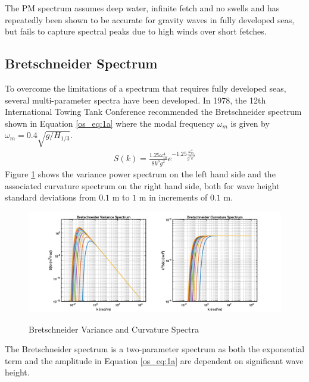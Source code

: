 The PM spectrum assumes deep water, infinite fetch and no swells and has repeatedly been shown to be accurate for gravity waves in fully developed seas, but fails to capture spectral peaks due to high winds over short fetches.

\subsection{Bretschneider Spectrum}
To overcome the limitations of a spectrum that requires fully developed seas, several multi-parameter spectra have been developed. In 1978, the 12th International Towing Tank Conference recommended the Bretschneider spectrum \cite{michel_sea_spectra} shown in Equation \ref{os_eq:1a} where the modal frequency $\omega_m$ is given by $\omega_m = 0.4\sqrt{g/H_{1/3}}$.
\begin{equation}
  \begin{gathered}
  \label{os_eq:1a}
  S(k) = \frac{1.25 \omega_m^4}{8k^3g^2}e^{-1.25\frac{\omega_m^4}{g^2k^2}} 
  \end{gathered}
\end{equation}
\renewcommand{\baselinestretch}{2} \small\normalsize
Figure \ref{os_fig:1a} shows the variance power spectrum on the left hand side and the associated curvature spectrum on the right hand side, both for wave height standard deviations from $0.1$ m to $1$ m in increments of $0.1$ m.

 \begin{figure}[H]
  \begin{center}
\includegraphics[width=6in]{../media/Ocean_Surface/bs_variance_curvature_spectrum.png}
  \end{center}
  \renewcommand{\baselinestretch}{1} \small\normalsize
  \begin{quote}
    \caption[Bretschneider Variance and Curvature Spectra]{Bretschneider Variance and Curvature Spectra\label{os_fig:1a}}
  \end{quote}
\end{figure}
 \renewcommand{\baselinestretch}{2} \small\normalsize
The Bretschneider spectrum is a two-parameter spectrum as both the exponential term and the amplitude in Equation \ref{os_eq:1a} are dependent on significant wave height.

